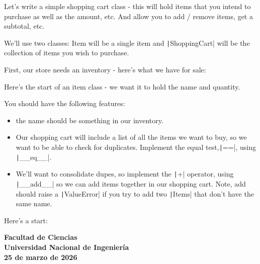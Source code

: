\begin{questions}
	\question

	Let's write a simple shopping cart class - this will hold items
	that you intend to purchase as well as the amount, etc.
	And allow you to add / remove items, get a subtotal, etc.

	We'll use two classes:
	Item will be a single item and \texttt|ShoppingCart|
	will be the collection of items you wish to purchase.

	First, our store needs an inventory - here's what we have for sale:

	Here's the start of an item class - we want it to hold the name and quantity.

	You should have the following features:

	\begin{itemize}
		\item

		      the name should be something in our inventory.

		\item

		      Our shopping cart will include a list of all the items we
		      want to buy, so we want to be able to check for duplicates.
		      Implement the equal test,\texttt|==|, using
		      \texttt|__eq__|.

		\item

		      We'll want to consolidate dupes, so implement the
		      \texttt|+| operator, using
		      \texttt|__add__| so we can add items together in our shopping cart.
		      Note, add should raise a \texttt|ValueError| if you try to add two \texttt|Items| that don't have the same name.
	\end{itemize}
	Here's a start:
\end{questions}
\vfill
\begin{flushright}\bfseries
	Facultad de Ciencias\\[2mm]
	Universidad Nacional de Ingeniería\\[2mm]
	25 de marzo de 2026
\end{flushright}

